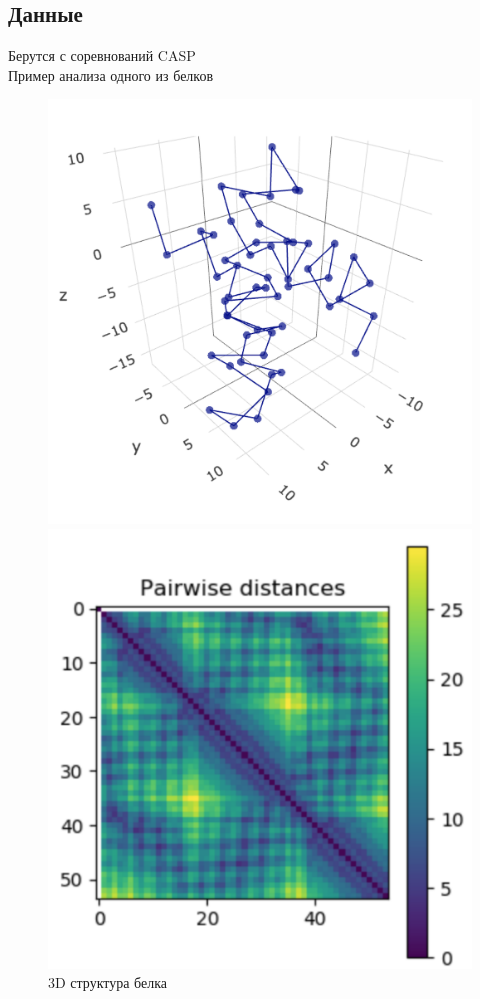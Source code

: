 \documentclass[12pt,twosides]{article}
\begin{document}
			\subsection{Данные}
			Берутся с соревнований CASP \\
			Пример анализа одного из белков
			\begin{figure}[!h]
				\centering
				\begin{minipage}[b]{0.45\textwidth}
					\includegraphics[width=\textwidth]{fig1.pdf}
					\caption{3D структура белка}
				\end{minipage}
				\hfill
				\begin{minipage}[b]{0.45\textwidth}
					\includegraphics[width=\textwidth]{fig2.pdf}

\end{minipage}
\end{figure}
\end{document}
